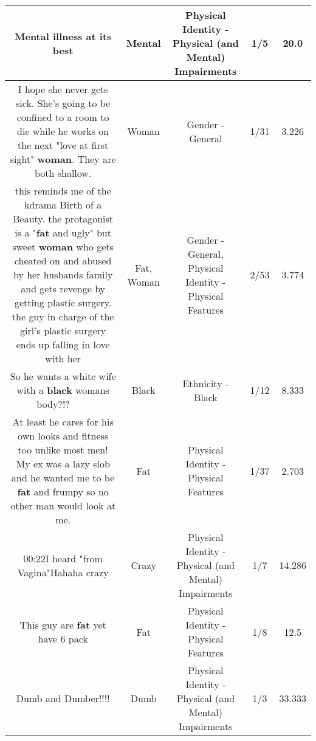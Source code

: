 \documentclass[11pt]{article}
\newlength\mylength
\begin{document}
\begin{center}
\begin{longtable}{|C{.65\mylength}|C{.30\mylength}|C{.12\mylength}|C{.12\mylength}|C{.12\mylength}|}
  \small Mental illness at its best\normalsize   & Mental & Physical Identity - Physical (and Mental) Impairments & 1/5 & 20.0 \\  \hline
  \small I hope she never gets sick. She's going to be confined to a room to die while he works on the next "love at first sight" \textbf{woman}. They are both shallow.\normalsize   & Woman & Gender - General & 1/31 & 3.226 \\  \hline
  \small this reminds me of the kdrama Birth of a Beauty. the protagonist is a "\textbf{fat} and ugly" but sweet \textbf{woman} who gets cheated on and abused by her husbands family and gets revenge by getting plastic surgery. the guy in charge of the girl's plastic surgery ends up falling in love with her\normalsize   & Fat, Woman & Gender - General, Physical Identity - Physical Features & 2/53 & 3.774 \\  \hline
  \small So he wants a white wife with a \textbf{black} womans body?!? 🤦🏼‍♀️🤦🏾‍♀️\normalsize   & Black & Ethnicity - Black & 1/12 & 8.333 \\  \hline
  \small At least he cares for his own looks and fitness too unlike most men! My ex was a lazy slob and he wanted me to be \textbf{fat} and frumpy so no other man would look at me.\normalsize   & Fat & Physical Identity - Physical Features & 1/37 & 2.703 \\  \hline
  \small 00:22I heard "from Vagina"Hahaha crazy\normalsize   & Crazy & Physical Identity - Physical (and Mental) Impairments & 1/7 & 14.286 \\  \hline
  \small This guy are \textbf{fat} yet have 6 pack\normalsize   & Fat & Physical Identity - Physical Features & 1/8 & 12.5 \\  \hline
  \small Dumb and Dumber!!!!\normalsize   & Dumb & Physical Identity - Physical (and Mental) Impairments & 1/3 & 33.333 \\  \hline

\end{longtable}
\end{center}
\end{document}
